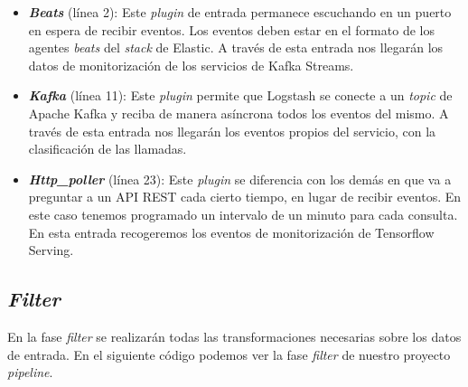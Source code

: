 \begin{itemize}
\item \textit{\textbf{Beats}} (línea 2): Este \textit{plugin} de entrada permanece escuchando en un puerto en espera de recibir eventos. Los eventos deben estar en el formato de los agentes \textit{beats} del \textit{stack} de Elastic. A través de esta entrada nos llegarán los datos de monitorización de los servicios de Kafka Streams. 

\item \textit{\textbf{Kafka}} (línea 11): Este \textit{plugin} permite que Logstash se conecte a un \textit{topic} de Apache Kafka y reciba de manera asíncrona todos los eventos del mismo. A través de esta entrada nos llegarán los eventos propios del servicio, con la clasificación de las llamadas.

\item \textbf{\textit{Http\_poller}} (línea 23): Este \textit{plugin} se diferencia con los demás en que va a preguntar a un API REST cada cierto tiempo, en lugar de recibir eventos. En este caso tenemos programado un intervalo de un minuto para cada consulta. En esta entrada recogeremos los eventos de monitorización de Tensorflow Serving.


\end{itemize}


\subsection{\textit{Filter}}

En la fase \textit{filter} se realizarán todas las transformaciones necesarias sobre los datos de entrada. En el siguiente código podemos ver la fase \textit{filter} de nuestro proyecto \textit{pipeline}. 

